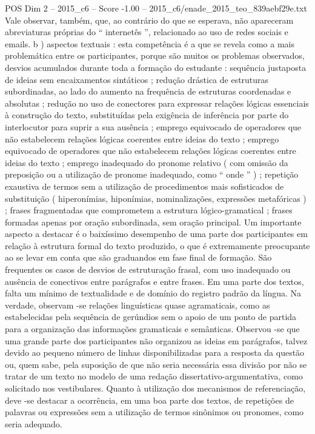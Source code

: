 \begin{textsample}{POS Dim 2 – 2015\_c6 – Score -1.00 – 2015\_c6/enade\_2015\_teo\_839aebf29e.txt}
Vale observar, também, que, ao contrário do que se esperava, não apareceram abreviaturas próprias do “ internetês ”, relacionado ao uso de redes sociais e emails. b ) aspectos textuais : esta competência é a que se revela como a mais problemática entre os participantes, porque são muitos os problemas observados, desvios acumulados durante toda a formação do estudante : sequência justaposta de ideias sem encaixamentos sintáticos ; redução drástica de estruturas subordinadas, ao lado do aumento na frequência de estruturas coordenadas e absolutas ; redução no uso de conectores para expressar relações lógicas essenciais à construção do texto, substituídas pela exigência de inferência por parte do interlocutor para suprir a sua ausência ; emprego equivocado de operadores que não estabelecem relações lógicas coerentes entre ideias do texto ; emprego equivocado de operadores que não estabelecem relações lógicas coerentes entre ideias do texto ; emprego inadequado do pronome relativo ( com omissão da preposição ou a utilização de pronome inadequado, como “ onde ” ) ; repetição exaustiva de termos sem a utilização de procedimentos mais sofisticados de substituição ( hiperonímias, hiponímias, nominalizações, expressões metafóricas ) ; frases fragmentadas que comprometem a estrutura lógico-gramatical ; frases formadas apenas por oração subordinada, sem oração principal.
Um importante aspecto a destacar é o baixíssimo desempenho de uma parte dos participantes em relação à estrutura formal do texto produzido, o que é extremamente preocupante ao se levar em conta que são graduandos em fase final de formação.
São frequentes os casos de desvios de estruturação frasal, com uso inadequado ou ausência de conectivos entre parágrafos e entre frases.
Em uma parte dos textos, falta um mínimo de textualidade e de domínio do registro padrão da língua.
Na verdade, observam -se relações linguísticas quase agramaticais, como as estabelecidas pela sequência de gerúndios sem o apoio de um ponto de partida para a organização das informações gramaticais e semânticas.
Observou -se que uma grande parte dos participantes não organizou as ideias em parágrafos, talvez devido ao pequeno número de linhas disponibilizadas para a resposta da questão ou, quem sabe, pela suposição de que não seria necessária essa divisão por não se tratar de um texto no modelo de uma redação dissertativo-argumentativa, como solicitado nos vestibulares.
Quanto à utilização dos mecanismos de referenciação, deve -se destacar a ocorrência, em uma boa parte dos textos, de repetições de palavras ou expressões sem a utilização de termos sinônimos ou pronomes, como seria adequado.

\end{textsample}
